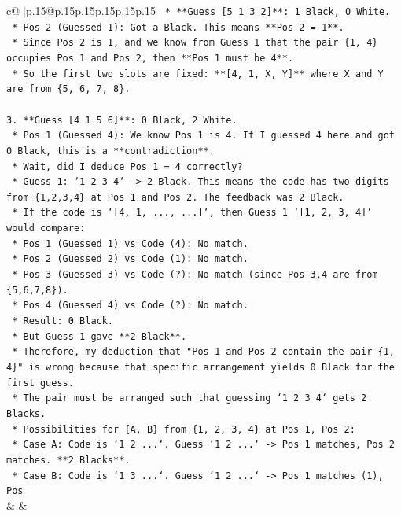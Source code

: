 \documentclass{article}
\begin{document}
{\begin{supertabular}{c@{$\;$}|p{.15\linewidth}@{}p{.15\linewidth}p{.15\linewidth}p{.15\linewidth}p{.15\linewidth}p{.15\linewidth}}
{{{\texttt{    *   **Guess {[}5 1 3 2{]}**: 1 Black, 0 White.} \\
\texttt{        *   Pos 2 (Guessed 1): Got a Black. This means **Pos 2 = 1**.} \\
\texttt{        *   Since Pos 2 is 1, and we know from Guess 1 that the pair \{1, 4\} occupies Pos 1 and Pos 2, then **Pos 1 must be 4**.} \\
\texttt{        *   So the first two slots are fixed: **{[}4, 1, X, Y{]}** where X and Y are from \{5, 6, 7, 8\}.} \\
\\ 
\texttt{3.  **Guess {[}4 1 5 6{]}**: 0 Black, 2 White.} \\
\texttt{    *   Pos 1 (Guessed 4): We know Pos 1 is 4. If I guessed 4 here and got 0 Black, this is a **contradiction**.} \\
\texttt{    *   Wait, did I deduce Pos 1 = 4 correctly?} \\
\texttt{        *   Guess 1: `1 2 3 4` {-}> 2 Black. This means the code has two digits from \{1,2,3,4\} at Pos 1 and Pos 2. The feedback was 2 Black.} \\
\texttt{        *   If the code is `{[}4, 1, ..., ...{]}`, then Guess 1 `{[}1, 2, 3, 4{]}` would compare:} \\
\texttt{            *   Pos 1 (Guessed 1) vs Code (4): No match.} \\
\texttt{            *   Pos 2 (Guessed 2) vs Code (1): No match.} \\
\texttt{            *   Pos 3 (Guessed 3) vs Code (?): No match (since Pos 3,4 are from \{5,6,7,8\}).} \\
\texttt{            *   Pos 4 (Guessed 4) vs Code (?): No match.} \\
\texttt{            *   Result: 0 Black.} \\
\texttt{    *   But Guess 1 gave **2 Black**.} \\
\texttt{    *   Therefore, my deduction that "Pos 1 and Pos 2 contain the pair \{1, 4\}" is wrong because that specific arrangement yields 0 Black for the first guess.} \\
\texttt{    *   The pair must be arranged such that guessing `1 2 3 4` gets 2 Blacks.} \\
\texttt{    *   Possibilities for \{A, B\} from \{1, 2, 3, 4\} at Pos 1, Pos 2:} \\
\texttt{        *   Case A: Code is `1 2 ...`. Guess `1 2 ...` {-}> Pos 1 matches, Pos 2 matches. **2 Blacks**.} \\
\texttt{        *   Case B: Code is `1 3 ...`. Guess `1 2 ...` {-}> Pos 1 matches (1), Pos} \\
            }
        }
    }
    & & \\ \\


\end{supertabular}}
\end{document}
